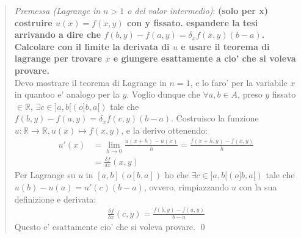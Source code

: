 \documentclass{article}
\begin{document}
\begin{quote}
  \emph{Premessa (Lagrange in $n > 1$ o del valor intermedio)}: \textbf{(solo per x)
  costruire $u(x) = f(x, y)$ con y fissato. espandere la tesi arrivando a dire
  che $f(b,y) - f(a,y) = \delta_x f(\overline{x}, y)(b-a)$.
  Calcolare con il limite la derivata di $u$ e usare il teorema di lagrange per trovare $\overline{x}$ e 
  giungere esattamente a cio' che si voleva provare.} \\
  Devo mostrare il teorema di Lagrange in $n=1$, e lo faro' per la
  variabile $x$ in quantoo e' analogo per la $y$. Voglio dunque che $\forall a, b \in A$,
  preso $y$ fissato $\in \mathbb{R}$, $\exists c \in ]a, b[ (o ]b, a[)$
  tale che $f(b, y) - f(a, y) = \delta_x f(c, y)(b-a)$.
  Costruisco la funzione $u: \mathbb{R} \to \mathbb{R}, u(x) \mapsto f(x, y)$, 
  e la derivo ottenendo:
  \begin{align*}
    u'(x) &= \lim_{h \to 0} \frac{u(x + h) - u(x)}{h} = \frac{f(x+h, y) - f(x, y)}{h} \\
          &= \frac{\delta f}{\delta x} (x, y)
  \end{align*}
  Per Lagrange su $u$ in $[a, b] (o [b, a])$ ho che $\exists c \in ]a,b[ (o ]b,a[)$
  tale che $u(b) - u(a) = u'(c)(b-a)$, ovvero, rimpiazzando $u$ con la sua definizione e derivata:
  \begin{align*}
    \frac{\delta f}{\delta x}(c, y) = \frac{f(b, y) - f(a, y)}{b-a}
  \end{align*}
  Questo e' esattamente cio' che si voleva provare.
  \qed
\end{quote}
\end{document}
